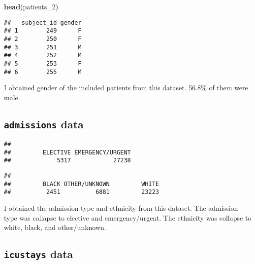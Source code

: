 \documentclass[
]{article}
\newenvironment{Shaded}{\begin{snugshade}}{\end{snugshade}}
\newcommand{\FunctionTok}[1]{\textcolor[rgb]{0.13,0.29,0.53}{\textbf{#1}}}
\newcommand{\NormalTok}[1]{#1}
\newcommand{\SpecialCharTok}[1]{\textcolor[rgb]{0.81,0.36,0.00}{\textbf{#1}}}
\begin{document}
\begin{Shaded}
\begin{Highlighting}[]
\FunctionTok{head}\NormalTok{(patients\_2)}
\end{Highlighting}
\end{Shaded}

\begin{verbatim}
##   subject_id gender
## 1        249      F
## 2        250      F
## 3        251      M
## 4        252      M
## 5        253      F
## 6        255      M
\end{verbatim}

I obtained gender of the included patients from this dataset. 56.8\% of
them were male.

\hypertarget{admissions-data}{%
\subsection{\texorpdfstring{\texttt{admissions}
data}{admissions data}}\label{admissions-data}}

\begin{Shaded}
\end{Shaded}

\begin{verbatim}
## 
##         ELECTIVE EMERGENCY/URGENT 
##             5317            27238
\end{verbatim}

\begin{Shaded}
\end{Shaded}

\begin{verbatim}
## 
##         BLACK OTHER/UNKNOWN         WHITE 
##          2451          6881         23223
\end{verbatim}

I obtained the admission type and ethnicity from this dataset. The
admission type was collapse to elective and emergency/urgent. The
ethnicity was collapse to white, black, and other/unknown.

\hypertarget{icustays-data}{%
\subsection{\texorpdfstring{\texttt{icustays}
data}{icustays data}}\label{icustays-data}}
\end{document}
